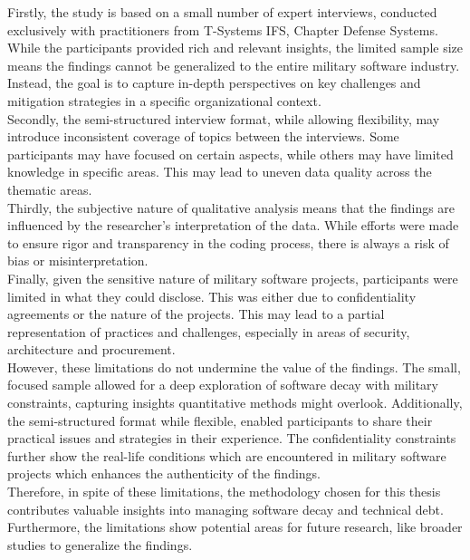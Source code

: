 Firstly, the study is based on a small number of expert interviews, conducted exclusively with practitioners from T-Systems IFS, Chapter Defense Systems. While the participants provided rich and relevant insights, the limited sample size means the findings cannot be generalized to the entire military software industry. 
Instead, the goal is to capture in-depth perspectives on key challenges and mitigation strategies in a specific organizational context.\\

Secondly, the semi-structured interview format, while allowing flexibility, may introduce inconsistent coverage of topics between the interviews. Some participants may have focused on certain aspects, while others may have limited knowledge in specific areas. This may lead to uneven data quality across the thematic areas.\\

Thirdly, the subjective nature of qualitative analysis means that the findings are influenced by the researcher's interpretation of the data. While efforts were made to ensure rigor and transparency in the coding process, there is always a risk of bias or misinterpretation.\\

Finally, given the sensitive nature of military software projects, participants were limited in what they could disclose. This was either due to confidentiality agreements or the nature of the projects. This may lead to a partial representation of practices and challenges, especially in areas of security, architecture and procurement.\\

However, these limitations do not undermine the value of the findings. The small, focused sample allowed for a deep exploration of software decay with military constraints, capturing insights quantitative methods might overlook. Additionally, the semi-structured format
while flexible, enabled participants to share their practical issues and strategies in their experience. The confidentiality constraints further show the real-life conditions which are encountered in military software projects which enhances the authenticity of the findings.\\

Therefore, in spite of these limitations, the methodology chosen for this thesis contributes valuable insights into managing software decay and technical debt. Furthermore, the limitations show potential areas for future research, like broader studies to generalize the findings.

